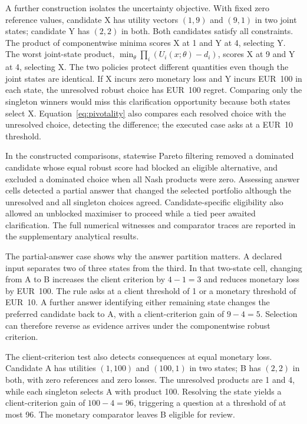 \documentclass[oneside,10pt,english]{swissi}
\begin{document}
A further construction isolates the uncertainty objective. With fixed zero reference values, candidate X has utility vectors $(1,9)$ and $(9,1)$ in two joint states; candidate Y has $(2,2)$ in both. Both candidates satisfy all constraints. The product of componentwise minima scores X at 1 and Y at 4, selecting Y. The worst joint-state product, $\min_{\theta}\prod_i(U_i(x;\theta)-d_i)$, scores X at 9 and Y at 4, selecting X. The two policies protect different quantities even though the joint states are identical. If X incurs zero monetary loss and Y incurs EUR~100 in each state, the unresolved robust choice has EUR~100 regret. Comparing only the singleton winners would miss this clarification opportunity because both states select X. Equation~\eqref{eq:pivotality} also compares each resolved choice with the unresolved choice, detecting the difference; the executed case asks at a EUR~10 threshold.

In the constructed comparisons, statewise Pareto filtering removed a dominated candidate whose equal robust score had blocked an eligible alternative, and excluded a dominated choice when all Nash products were zero. Assessing answer cells detected a partial answer that changed the selected portfolio although the unresolved and all singleton choices agreed. Candidate-specific eligibility also allowed an unblocked maximiser to proceed while a tied peer awaited clarification. The full numerical witnesses and comparator traces are reported in the supplementary analytical results.

The partial-answer case shows why the answer partition matters. A declared input separates two of three states from the third. In that two-state cell, changing from A to B increases the client criterion by $4-1=3$ and reduces monetary loss by EUR~100. The rule asks at a client threshold of 1 or a monetary threshold of EUR~10. A further answer identifying either remaining state changes the preferred candidate back to A, with a client-criterion gain of $9-4=5$. Selection can therefore reverse as evidence arrives under the componentwise robust criterion.

The client-criterion test also detects consequences at equal monetary loss. Candidate A has utilities $(1,100)$ and $(100,1)$ in two states; B has $(2,2)$ in both, with zero references and zero losses. The unresolved products are 1 and 4, while each singleton selects A with product 100. Resolving the state yields a client-criterion gain of $100-4=96$, triggering a question at a threshold of at most 96. The monetary comparator leaves B eligible for review.
\end{document}
